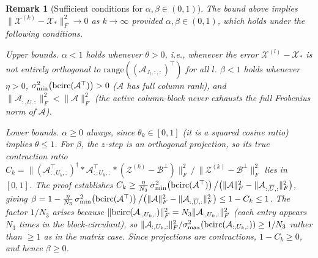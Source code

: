 \documentclass[11pt]{article}
\newtheorem{remark}[theorem]{Remark}
\def\fm#1{\mathcal{#1}}
\begin{document}
\begin{remark}[Sufficient conditions for $\alpha,\beta\in(0,1)$]
\label{rem:alpha-beta}
The bound above implies $\|\fm X^{(k)}-\fm X_\ast\|_F^2\to 0$ as $k\to\infty$
provided $\alpha,\beta\in(0,1)$, which holds under the following conditions.

\textit{Upper bounds.}
$\alpha<1$ holds whenever $\theta>0$, i.e., whenever the error $\fm X^{(l)}-\fm X_\ast$ is not entirely orthogonal to $\mathrm{range}((\fm A_{J_l,:,:})^\top)$ for all $l$.
$\beta<1$ holds whenever $\eta>0$,
$\sigma_{\min}^2\!\left(\bcirc(\fm A^\top)\right)>0$ ($\fm A$ has full column rank),
and $\|\fm A_{:,\overline{U},:}\|_F^2<\|\fm A\|_F^2$ (the active column-block
never exhausts the full Frobenius norm of $\fm A$).

\textit{Lower bounds.}
$\alpha\geq 0$ always, since $\theta_k\in[0,1]$ (it is a squared cosine ratio) implies $\theta\leq 1$.
For $\beta$, the $z$-step is an orthogonal projection, so its true contraction
ratio $C_k = \|\left(\fm A_{:,U_k,:}^\top\right)^\dagger *\fm A_{:,U_k,:}^\top *
(\fm Z^{(k)}-\fm B^\perp)\|_F^2\,\big/\,\|\fm Z^{(k)}-\fm B^\perp\|_F^2$
lies in $[0,1]$.
The proof establishes
$C_k\geq\frac{\eta}{N_3}\,\sigma_{\min}^2\!\left(\bcirc(\fm A^\top)\right)\big/
\bigl(\|\fm A\|_F^2-\|\fm A_{:,\overline{U},:}\|_F^2\bigr)$,
giving $\beta = 1-\frac{\eta}{N_3}\,\sigma_{\min}^2\!\left(\bcirc(\fm A^\top)\right)\big/
\bigl(\|\fm A\|_F^2-\|\fm A_{:,\overline{U},:}\|_F^2\bigr)\leq 1-C_k\leq 1$.
The factor $1/N_3$ arises because $\|\bcirc(\fm A_{:,U_k,:})\|_F^2 = N_3\|\fm A_{:,U_k,:}\|_F^2$
(each entry appears $N_3$ times in the block-circulant), so
$\|\fm A_{:,U_k,:}\|_F^2/\sigma_{\max}^2(\bcirc(\fm A_{:,U_k,:}))\geq 1/N_3$
rather than $\geq 1$ as in the matrix case.
Since projections are contractions, $1-C_k\geq 0$, and hence $\beta\geq 0$.
\end{remark}
\end{document}
